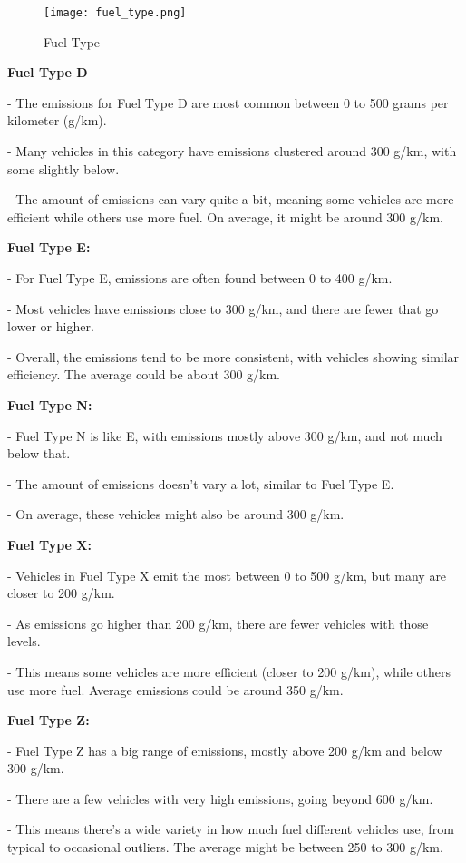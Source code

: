 \documentclass[12pt, a4paper,oneside]{book}
\numberwithin{equation}{section}
\begin{document}
 \begin{figure}[H]
\centerline{\texttt{[image: fuel\_type.png]}}
\caption{Fuel Type}
\label{fig:4.2}
\end{figure}

\newpage
\textbf{Fuel Type D }

- The emissions for Fuel Type D are most common between 0 to 500 grams per kilometer (g/km).

- Many vehicles in this category have emissions clustered around 300 g/km, with some slightly below.



- The amount of emissions can vary quite a bit, meaning some vehicles are more efficient while others use more fuel. On average, it might be around 300 g/km.

	
\textbf{Fuel Type E:}

-	For Fuel Type E, emissions are often found between 0 to 400 g/km.

-	Most vehicles have emissions close to 300 g/km, and there are fewer that go lower or higher.

-	Overall, the emissions tend to be more consistent, with vehicles showing similar efficiency. The average could be about 300 g/km.

\textbf{Fuel Type N:}

- 	Fuel Type N is like E, with emissions mostly above 300 g/km, and not much below that.

-   The amount of emissions doesn't vary a lot, similar to Fuel Type E.

-   On average, these vehicles might also be around 300 g/km.


\textbf{Fuel Type X:}

-	Vehicles in Fuel Type X emit the most between 0 to 500 g/km, but many are closer to 200 g/km.

-   As emissions go higher than 200 g/km, there are fewer vehicles with those levels.

-	This means some vehicles are more efficient (closer to 200 g/km), while others use more fuel. Average emissions could be around 350 g/km.

\textbf{Fuel Type Z:}

-	Fuel Type Z has a big range of emissions, mostly above 200 g/km and below 300 g/km.

-   There are a few vehicles with very high emissions, going beyond 600 g/km.

-	This means there's a wide variety in how much fuel different vehicles use, from typical to occasional outliers. The average might be between 250 to 300 g/km.
\end{document}
